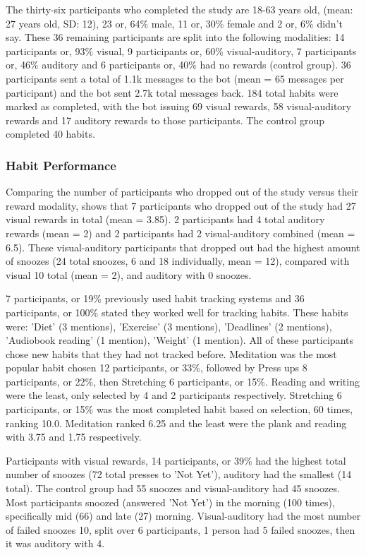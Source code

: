 The thirty-six participants who completed the study are 18-63 years old, (mean: 27 years old, SD: 12), 23 or, 64\% male, 11 or, 30\% female and 2 or, 6\% didn't say. These 36 remaining participants are split into the following modalities: 14 participants or, 93\% visual, 9 participants or, 60\% visual-auditory, 7 participants or, 46\% auditory and 6 participants or, 40\% had no rewards (control group). 36 participants sent a total of 1.1k messages to the bot (mean = 65 messages per participant) and the bot sent 2.7k total messages back. 184 total habits were marked as completed, with the bot issuing 69 visual rewards, 58 visual-auditory rewards and 17 auditory rewards to those participants. The control group completed 40 habits.

\subsubsection*{Habit Performance}
Comparing the number of participants who dropped out of the study versus their reward modality, shows that 7 participants who dropped out of the study had 27 visual rewards in total (mean = 3.85). 2 participants had 4 total auditory rewards (mean = 2) and 2 participants had 2 visual-auditory combined (mean = 6.5). These visual-auditory participants that dropped out had the highest amount of snoozes (24 total snoozes, 6 and 18 individually, mean = 12), compared with visual 10 total (mean = 2), and auditory with 0 snoozes.

7 participants, or 19\% previously used habit tracking systems and 36 participants, or 100\% stated they worked well for tracking habits. These habits were: 'Diet' (3 mentions), 'Exercise' (3 mentions), 'Deadlines' (2 mentions), 'Audiobook reading' (1 mention), 'Weight' (1 mention). All of these participants chose new habits that they had not tracked before. Meditation was the most popular habit chosen 12 participants, or 33\%, followed by Press ups 8 participants, or 22\%, then Stretching 6 participants, or 15\%. Reading and writing were the least, only selected by 4 and 2 participants respectively. Stretching 6 participants, or 15\% was the most completed habit based on selection, 60 times, ranking 10.0. Meditation ranked 6.25 and the least were the plank and reading with 3.75  and 1.75 respectively.

Participants with visual rewards, 14 participants, or 39\% had the highest total number of snoozes (72 total presses to 'Not Yet'), auditory had the smallest (14 total). The control group had 55 snoozes and visual-auditory had 45 snoozes. Most participants snoozed (answered 'Not Yet') in the morning (100 times), specifically mid (66) and late (27) morning. Visual-auditory had the most number of failed snoozes 10, split over 6 participants, 1 person had 5 failed snoozes, then it was auditory with 4.

